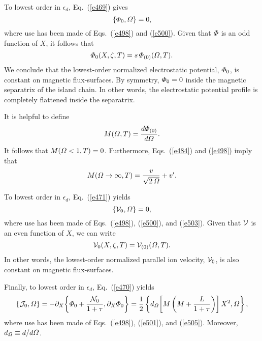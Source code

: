 \documentclass[12pt,prb,aps]{revtex4-1}
\begin{document}
To lowest order in $\epsilon_d$, Eq.~(\ref{e469}) gives
\begin{equation}
\{{\mit\Phi}_0,{\mit\Omega}\}=0,
\end{equation}
where use has been made of Eqs.~(\ref{e498}) and (\ref{e500}). Given that
${\mit\Phi}$ is an odd function of $X$, it follows that 
\begin{equation}\label{e503}
{\mit\Phi}_0(X,\zeta,T) = s\, {\mit\Phi}_{(0)}({\mit\Omega},T).
\end{equation}
 We conclude that the lowest-order normalized
electrostatic potential, ${\mit\Phi}_{0}$, is  constant on magnetic flux-surfaces. 
By symmetry, ${\mit\Phi}_{0}=0$ inside the magnetic separatrix of the island chain. In other words, the electrostatic
potential profile is  completely flattened inside the separatrix. 

It is helpful to define
\begin{equation}\label{e505}
M({\mit\Omega},T) = \frac{d{\mit\Phi}_{(0)}}{d{\mit\Omega}}.
\end{equation}
It follows that $M({\mit\Omega}<1,T)=0$. Furthermore, Eqs.~(\ref{e484}) and (\ref{e498}) imply that
\begin{equation}\label{e506}
M({\mit\Omega}\rightarrow\infty,T) = \frac{v}{\sqrt{2\,{\mit\Omega}}}+ v'.
\end{equation}

To lowest order in $\epsilon_d$, Eq.~(\ref{e471}) yields
\begin{equation}
\{{\cal V}_0,{\mit\Omega}\} = 0,
\end{equation}
where use has been made of Eqs.~(\ref{e498}), (\ref{e500}), and (\ref{e503}). Given that
${\cal V}$ is an even function of $X$, we can write
\begin{equation}\label{e508}
{\cal V}_0(X,\zeta,T) = {\cal V}_{(0)}({\mit\Omega},T).
\end{equation}
In other words, the lowest-order normalized parallel ion velocity, ${\cal V}_0$, is also constant on
magnetic flux-surfaces. 

Finally, to lowest order in $\epsilon_d$, Eq.~(\ref{e470}) yields
\begin{equation}\label{e509}
\{{\cal J}_0,{\mit\Omega}\} = -\partial_X\!\left\{{\mit\Phi}_0+\frac{{\cal N}_0}{1+\tau}, \partial_X {\mit\Phi}_0\right\}=
\frac{1}{2}\left\{d_{\mit\Omega}\!\left[M\left(M+\frac{L}{1+\tau}\right)\right]X^2, {\mit\Omega}\right\},
\end{equation}
where use has been made of Eqs.~(\ref{e498}), (\ref{e501}), and (\ref{e505}). Moreover, $d_{\mit\Omega}\equiv
d/d{\mit\Omega}$. 
\end{document}
